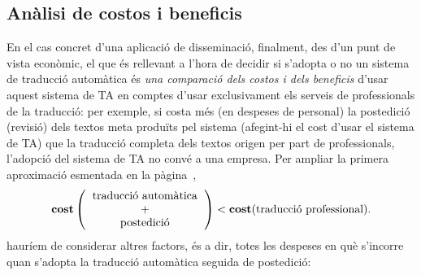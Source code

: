 \subsection{Anàlisi de costos i beneficis}
 \label{ss:costdetall} En el cas concret d'una aplicació de
  disseminació, finalment, des d'un punt de vista econòmic, el que és
  rellevant a l'hora de decidir si s'adopta o no un sistema de
  traducció automàtica és \emph{una comparació dels costos i dels
    beneficis} d'usar aquest sistema de TA en comptes d'usar exclusivament els serveis de
  professionals de la traducció: per exemple, si
  costa més (en despeses de personal) la postedició (revisió) dels
  textos meta produïts pel sistema (afegint-hi el cost d'usar el
  sistema de TA) que la traducció completa dels textos origen per part
  de professionals, l'adopció del sistema de TA no convé a una
  empresa. Per ampliar la primera aproximació esmentada en la
  pàgina~\pageref{pg:cost},
$$\textbf{cost}\left(\mbox{\begin{tabular}{c}traducció automàtica\\ +\\
      postedició\end{tabular}}\right) <
\textbf{cost}(\mbox{traducció professional}).
$$
hauríem de considerar altres factors, és a dir, totes les despeses en
què s'incorre quan s'adopta la traducció automàtica seguida de
postedició:
